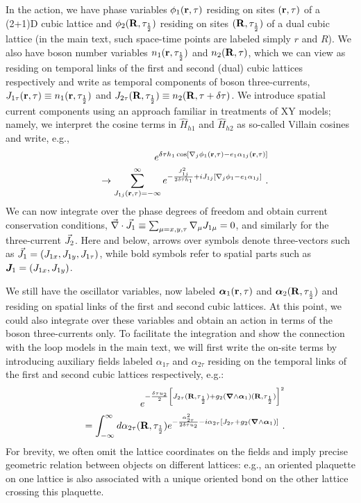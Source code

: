 In the action, we have phase variables $\phi_1({\bf r}, \tau)$ residing on sites $({\bf r}, \tau)$ of a (2+1)D cubic lattice and $\phi_2({\bf R}, \tau_{\frac{1}{2}})$ residing on sites $({\bf R}, \tau_{\frac{1}{2}})$ of a dual cubic lattice (in the main text, such space-time points are labeled simply $r$ and $R$).  We also have boson number variables $n_1({\bf r}, \tau_{\frac{1}{2}})$ and $n_2({\bf R}, \tau)$, which we can view as residing on temporal links of the first and second (dual) cubic lattices respectively and write as temporal components of boson three-currents, $J_{1\tau}({\bf r}, \tau) \equiv n_1({\bf r}, \tau_{\frac{1}{2}})$ and $J_{2\tau}({\bf R}, \tau_{\frac{1}{2}}) \equiv n_2({\bf R}, \tau + \delta\tau)$.  We introduce spatial current components using an approach familiar in treatments of XY models; namely, we interpret the cosine terms in $\hat{H}_{h1}$ and $\hat{H}_{h2}$ as so-called Villain cosines and write, e.g.,
\begin{eqnarray*}
&& e^{\delta\tau h_1 \cos[\nabla_j \phi_1({\bf r}, \tau) - e_1 \alpha_{1j}({\bf r}, \tau)]} \\
&& \to \sum_{J_{1j}({\bf r}, \tau) = -\infty}^\infty e^{-\frac{J_{1j}^2}{2 \delta\tau h_1} + i J_{1j} [\nabla_j \phi_1 - e_1 \alpha_{1j}]} ~.
\end{eqnarray*}
We can now integrate over the phase degrees of freedom and obtain current conservation conditions, $\vec{\nabla} \cdot {\vec{J}}_1 \equiv \sum_{\mu=x, y, \tau} \nabla_\mu J_{1\mu} = 0$, and similarly for the three-current ${\vec{J}}_2$.
Here and below, arrows over symbols denote three-vectors such as ${\vec{J}}_1 = (J_{1x}, J_{1y}, J_{1\tau})$, while bold symbols refer to spatial parts such as ${\bm {J}}_1 = (J_{1x}, J_{1y})$.

We still have the oscillator variables, now labeled ${\bm \alpha}_1({\bf r}, \tau)$ and ${\bm \alpha}_2({\bf R}, \tau_{\frac{1}{2}})$ and residing on spatial links of the first and second cubic lattices.  At this point, we could also integrate over these variables and obtain an action in terms of the boson three-currents only.  To facilitate the integration and show the connection with the loop models in the main text, we will first write the on-site terms by introducing auxiliary fields labeled $\alpha_{1\tau}$ and $\alpha_{2\tau}$ residing on the temporal links of the first and second cubic lattices respectively, e.g.:
\begin{eqnarray*}
&& e^{-\frac{\delta\tau u_2}{2} \left[J_{2\tau}({\bf R}, \tau_{\frac{1}{2}}) + g_2 ({\bm \nabla} \wedge {\bm \alpha}_1)({\bf R}, \tau_{\frac{1}{2}}) \right]^2} \\
&& = \int_{-\infty}^\infty d\alpha_{2\tau}({\bf R}, \tau_{\frac{1}{2}}) e^{-\frac{\alpha_{2\tau}^2}{2 \delta\tau u_2} - i \alpha_{2\tau} \left[J_{2\tau} + g_2 ({\bm \nabla} \wedge {\bm \alpha}_1) \right]} ~.
\end{eqnarray*}
For brevity, we often omit the lattice coordinates on the fields and imply precise geometric relation between objects on different lattices: e.g., an oriented plaquette on one lattice is also associated with a unique oriented bond on the other lattice crossing this plaquette.

